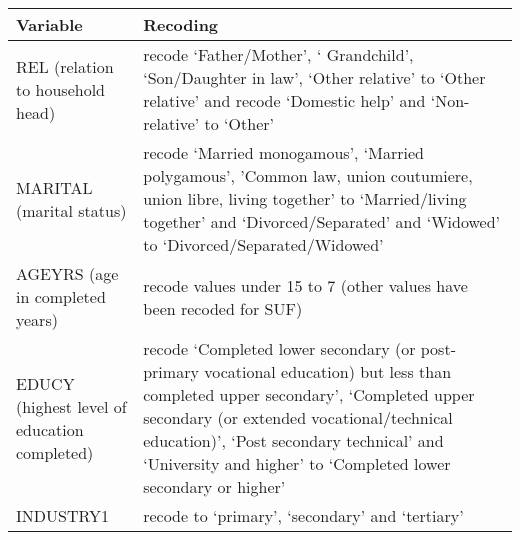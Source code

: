 \documentclass[letterpaper,10pt,english]{sphinxmanual}
\begin{document}
\begin{savenotes}\sphinxattablestart
\centering
{}
\label{\detokenize{casestudies:tab924}}\label{\detokenize{casestudies:id45}}
\sphinxaftercaption
\begin{tabulary}{\linewidth}[t]{|T|T|}
\hline
\sphinxstyletheadfamily 
Variable
&\sphinxstyletheadfamily 
Recoding
\\
\hline
REL (relation to household head)
&
recode ‘Father/Mother’, ‘
Grandchild’, ‘Son/Daughter in
law’, ‘Other relative’ to ‘Other
relative’ and recode ‘Domestic
help’ and ‘Non-relative’ to
‘Other’
\\
\hline
MARITAL (marital status)
&
recode ‘Married monogamous’,
‘Married polygamous’, ’Common
law, union coutumiere, union
libre, living together’ to
‘Married/living together’ and
‘Divorced/Separated’ and
‘Widowed’ to
‘Divorced/Separated/Widowed’
\\
\hline
AGEYRS (age in completed years)
&
recode values under 15 to 7
(other values have been recoded
for SUF)
\\
\hline
EDUCY (highest level of education completed)
&
recode ‘Completed lower secondary
(or post-primary vocational
education) but less than
completed upper secondary’,
‘Completed upper secondary (or
extended vocational/technical
education)’, ‘Post secondary
technical’ and ‘University and
higher’ to ‘Completed lower
secondary or higher’
\\
\hline
INDUSTRY1
&
recode to ‘primary’, ‘secondary’
and ‘tertiary’
\\
\hline
\end{tabulary}
\par
\sphinxattableend\end{savenotes}
\end{document}
